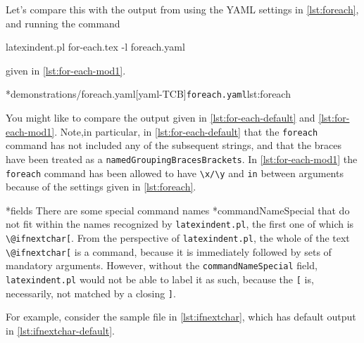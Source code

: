 	Let's compare this with the output from using the YAML settings in \cref{lst:foreach}, and running the command
	\begin{commandshell}
latexindent.pl for-each.tex -l foreach.yaml  
\end{commandshell}
	given in \cref{lst:for-each-mod1}.

	\begin{minipage}{.45\textwidth}
	\end{minipage}
	\hfill
	\begin{minipage}{.49\textwidth}
		\cmhlistingsfromfile[style=yaml-LST]*{demonstrations/foreach.yaml}[yaml-TCB]{\texttt{foreach.yaml}}{lst:foreach}
	\end{minipage}

	You might like to compare the output given in \cref{lst:for-each-default} and \cref{lst:for-each-mod1}. Note,in particular, in
	\cref{lst:for-each-default} that the \texttt{foreach} command has not included any of the subsequent strings, and that the braces
	have been treated as a \texttt{namedGroupingBracesBrackets}. In \cref{lst:for-each-mod1} the \texttt{foreach} command has been allowed to have \lstinline!\x/\y! and \texttt{in} between
	arguments because of the settings given in \cref{lst:foreach}.

*{fields}
	There are some special command names%
	*{commandNameSpecial} that do not fit within the names recognized by \texttt{latexindent.pl},
	the first one of which is \lstinline!\@ifnextchar[!. From the perspective of \texttt{latexindent.pl}, the whole of the
	text \lstinline!\@ifnextchar[! is a command, because it is
	immediately followed by sets of mandatory arguments. However, without the \texttt{commandNameSpecial} field, \texttt{latexindent.pl}
	would not be able to label it as such, because the \lstinline![! is, necessarily, not matched by a closing \lstinline!]!.

	For example, consider the sample file in \cref{lst:ifnextchar}, which has default output in \cref{lst:ifnextchar-default}.

	\begin{minipage}{.45\textwidth}
	\end{minipage}
	\hfill
	\begin{minipage}{.45\textwidth}
	\end{minipage}

